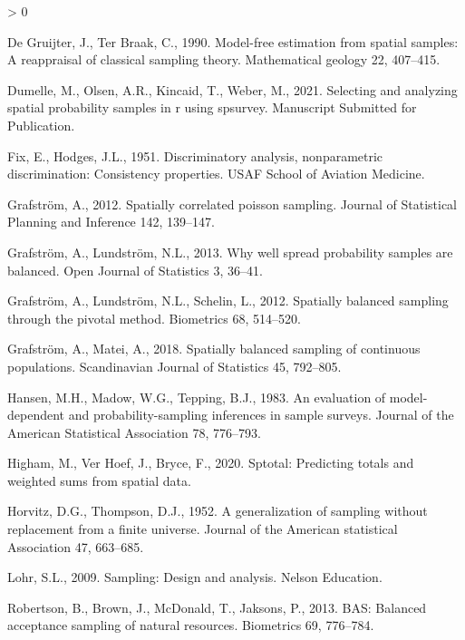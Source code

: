 \documentclass[]{elsarticle} %
\newlength{\cslhangindent}
\newenvironment{CSLReferences}[2] %
 {%
  \setlength{\parindent}{0pt}
  \ifodd #1 \everypar{\setlength{\hangindent}{\cslhangindent}}\ignorespaces\fi
  \ifnum #2 > 0
  \setlength{\parskip}{#2\baselineskip}
  \fi
 }%
 {}
\begin{document}
\begin{CSLReferences}{1}{0}
\leavevmode\hypertarget{ref-de1990model}{}%
De Gruijter, J., Ter Braak, C., 1990. Model-free estimation from spatial
samples: A reappraisal of classical sampling theory. Mathematical
geology 22, 407--415.

\leavevmode\hypertarget{ref-dumelle2021spsurvey}{}%
Dumelle, M., Olsen, A.R., Kincaid, T., Weber, M., 2021. Selecting and
analyzing spatial probability samples in r using spsurvey. Manuscript
Submitted for Publication.

\leavevmode\hypertarget{ref-fix1951discriminatory}{}%
Fix, E., Hodges, J.L., 1951. Discriminatory analysis, nonparametric
discrimination: Consistency properties. USAF School of Aviation
Medicine.

\leavevmode\hypertarget{ref-grafstrom2012spatiallypoisson}{}%
Grafström, A., 2012. Spatially correlated poisson sampling. Journal of
Statistical Planning and Inference 142, 139--147.

\leavevmode\hypertarget{ref-grafstrom2013well}{}%
Grafström, A., Lundström, N.L., 2013. Why well spread probability
samples are balanced. Open Journal of Statistics 3, 36--41.

\leavevmode\hypertarget{ref-grafstrom2012spatially}{}%
Grafström, A., Lundström, N.L., Schelin, L., 2012. Spatially balanced
sampling through the pivotal method. Biometrics 68, 514--520.

\leavevmode\hypertarget{ref-grafstrom2018spatially}{}%
Grafström, A., Matei, A., 2018. Spatially balanced sampling of
continuous populations. Scandinavian Journal of Statistics 45, 792--805.

\leavevmode\hypertarget{ref-hansen1983evaluation}{}%
Hansen, M.H., Madow, W.G., Tepping, B.J., 1983. An evaluation of
model-dependent and probability-sampling inferences in sample surveys.
Journal of the American Statistical Association 78, 776--793.

\leavevmode\hypertarget{ref-higham2020sptotal}{}%
Higham, M., Ver Hoef, J., Bryce, F., 2020. Sptotal: Predicting totals
and weighted sums from spatial data.

\leavevmode\hypertarget{ref-horvitz1952generalization}{}%
Horvitz, D.G., Thompson, D.J., 1952. A generalization of sampling
without replacement from a finite universe. Journal of the American
statistical Association 47, 663--685.

\leavevmode\hypertarget{ref-lohr2009sampling}{}%
Lohr, S.L., 2009. Sampling: Design and analysis. Nelson Education.

\leavevmode\hypertarget{ref-robertson2013bas}{}%
Robertson, B., Brown, J., McDonald, T., Jaksons, P., 2013. BAS: Balanced
acceptance sampling of natural resources. Biometrics 69, 776--784.


\end{CSLReferences}
\end{document}
